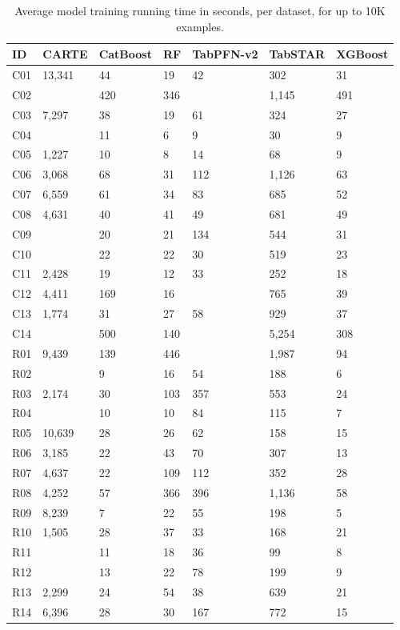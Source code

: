 \begin{table}
\centering
\footnotesize
\caption{Average model training running time in seconds, per dataset, for up to 10K examples.}
\label{tab:running_time}
\begin{tabular}{lllllll}
\toprule
ID & CARTE & CatBoost & RF & TabPFN-v2 & TabSTAR & XGBoost \\
\midrule
C01 & 13,341 & 44 & 19 & 42 & 302 & 31 \\
C02 &  & 420 & 346 &  & 1,145 & 491 \\
C03 & 7,297 & 38 & 19 & 61 & 324 & 27 \\
C04 &  & 11 & 6 & 9 & 30 & 9 \\
C05 & 1,227 & 10 & 8 & 14 & 68 & 9 \\
C06 & 3,068 & 68 & 31 & 112 & 1,126 & 63 \\
C07 & 6,559 & 61 & 34 & 83 & 685 & 52 \\
C08 & 4,631 & 40 & 41 & 49 & 681 & 49 \\
C09 &  & 20 & 21 & 134 & 544 & 31 \\
C10 &  & 22 & 22 & 30 & 519 & 23 \\
C11 & 2,428 & 19 & 12 & 33 & 252 & 18 \\
C12 & 4,411 & 169 & 16 &  & 765 & 39 \\
C13 & 1,774 & 31 & 27 & 58 & 929 & 37 \\
C14 &  & 500 & 140 &  & 5,254 & 308 \\
R01 & 9,439 & 139 & 446 &  & 1,987 & 94 \\
R02 &  & 9 & 16 & 54 & 188 & 6 \\
R03 & 2,174 & 30 & 103 & 357 & 553 & 24 \\
R04 &  & 10 & 10 & 84 & 115 & 7 \\
R05 & 10,639 & 28 & 26 & 62 & 158 & 15 \\
R06 & 3,185 & 22 & 43 & 70 & 307 & 13 \\
R07 & 4,637 & 22 & 109 & 112 & 352 & 28 \\
R08 & 4,252 & 57 & 366 & 396 & 1,136 & 58 \\
R09 & 8,239 & 7 & 22 & 55 & 198 & 5 \\
R10 & 1,505 & 28 & 37 & 33 & 168 & 21 \\
R11 &  & 11 & 18 & 36 & 99 & 8 \\
R12 &  & 13 & 22 & 78 & 199 & 9 \\
R13 & 2,299 & 24 & 54 & 38 & 639 & 21 \\
R14 & 6,396 & 28 & 30 & 167 & 772 & 15 \\

\end{tabular}
\end{table}
